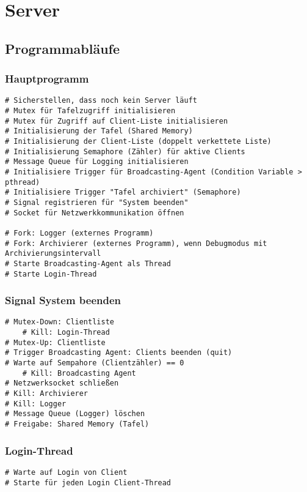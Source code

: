 \section{Server}

\subsection{Programmabläufe}

\subsubsection{Hauptprogramm}
\begin{lstlisting}
# Sicherstellen, dass noch kein Server läuft
# Mutex für Tafelzugriff initialisieren
# Mutex für Zugriff auf Client-Liste initialisieren
# Initialisierung der Tafel (Shared Memory)
# Initialisierung der Client-Liste (doppelt verkettete Liste)
# Initialisierung Semaphore (Zähler) für aktive Clients
# Message Queue für Logging initialisieren
# Initialisiere Trigger für Broadcasting-Agent (Condition Variable > pthread)
# Initialisiere Trigger "Tafel archiviert" (Semaphore)
# Signal registrieren für "System beenden"
# Socket für Netzwerkkommunikation öffnen

# Fork: Logger (externes Programm)
# Fork: Archivierer (externes Programm), wenn Debugmodus mit Archivierungsintervall
# Starte Broadcasting-Agent als Thread
# Starte Login-Thread
\end{lstlisting}

\subsubsection{Signal System beenden}
\begin{lstlisting}
# Mutex-Down: Clientliste
    # Kill: Login-Thread
# Mutex-Up: Clientliste
# Trigger Broadcasting Agent: Clients beenden (quit)
# Warte auf Sempahore (Clientzähler) == 0
    # Kill: Broadcasting Agent
# Netzwerksocket schließen
# Kill: Archivierer
# Kill: Logger
# Message Queue (Logger) löschen
# Freigabe: Shared Memory (Tafel)
\end{lstlisting}

\subsubsection{Login-Thread}
\begin{lstlisting}
# Warte auf Login von Client
# Starte für jeden Login Client-Thread
\end{lstlisting}


